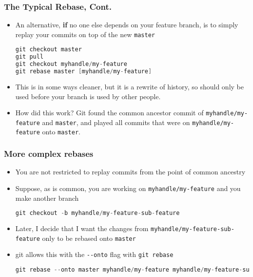 \documentclass{beamer}
\begin{document}
\begin{frame}[fragile]
\frametitle{The Typical Rebase, Cont.}
\begin{itemize}
\item An alternative, \textbf{if} no one else depends on your feature branch, is to simply replay your commits on top of the new \texttt{master}
\begin{lstlisting}[language=C++]
git checkout master
git pull
git checkout myhandle/my-feature
git rebase master [myhandle/my-feature]
\end{lstlisting}
\item This is in some ways cleaner, but it is a rewrite of history, so should only be used before your branch is used by other people.
\item How did this work? Git found the common ancestor commit of \texttt{myhandle/my-feature} and \texttt{master}, and played all commits that were on \texttt{myhandle/my-feature} onto \texttt{master}.
\end{itemize}
\end{frame}

\begin{frame}[fragile]
\frametitle{More complex rebases}
\begin{itemize}
\item You are not restricted to replay commits from the point of common ancestry
\item Suppose, as is common, you are working on \texttt{myhandle/my-feature} and you make another branch
\begin{lstlisting}[language=C++]
git checkout -b myhandle/my-feature-sub-feature
\end{lstlisting}
\item Later, I decide that I want the changes from \texttt{myhandle/my-feature-sub-feature} only to be rebased onto \texttt{master}
\item git allows this with the \lstinline{--onto} flag with \lstinline{git rebase}
\begin{lstlisting}[language=C++]
git rebase --onto master myhandle/my-feature myhandle/my-feature-sub-feature
\end{lstlisting}
\end{itemize}
\end{frame}
\end{document}
